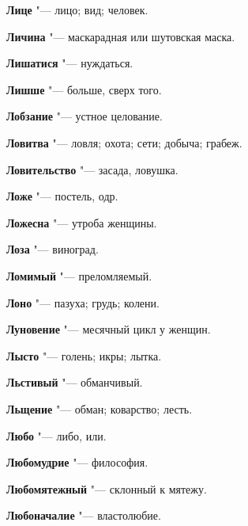 \begin{mymulticols}{2}
\noindent\textbf{Лице} "--- лицо; вид; человек. 




\noindent\textbf{Личина} "--- маскарадная или шутовская маска. 




\noindent\textbf{Лишатися} "--- нуждаться. 




\noindent\textbf{Лишше} "--- больше, сверх того. 




\noindent\textbf{Лобзание} "--- устное целование. 




\noindent\textbf{Ловитва} "--- ловля; охота; сети; добыча; грабеж. 




\noindent\textbf{Ловительство} "--- засада, ловушка. 




\noindent\textbf{Ложе} "--- постель, одр. 




\noindent\textbf{Ложесна} "--- утроба женщины. 




\noindent\textbf{Лоза} "--- виноград. 




\noindent\textbf{Ломимый} "--- преломляемый. 




\noindent\textbf{Лоно} "--- пазуха; грудь; колени. 




\noindent\textbf{Луновение} "--- месячный цикл у женщин. 




\noindent\textbf{Лысто} "--- голень; икры; лытка. 




\noindent\textbf{Льстивый} "--- обманчивый. 




\noindent\textbf{Льщение} "--- обман; коварство; лесть. 




\noindent\textbf{Любо} "--- либо, или. 




\noindent\textbf{Любомудрие} "--- философия. 




\noindent\textbf{Любомятежный} "--- склонный к мятежу. 




\noindent\textbf{Любоначалие} "--- властолюбие. 





\end{mymulticols}

